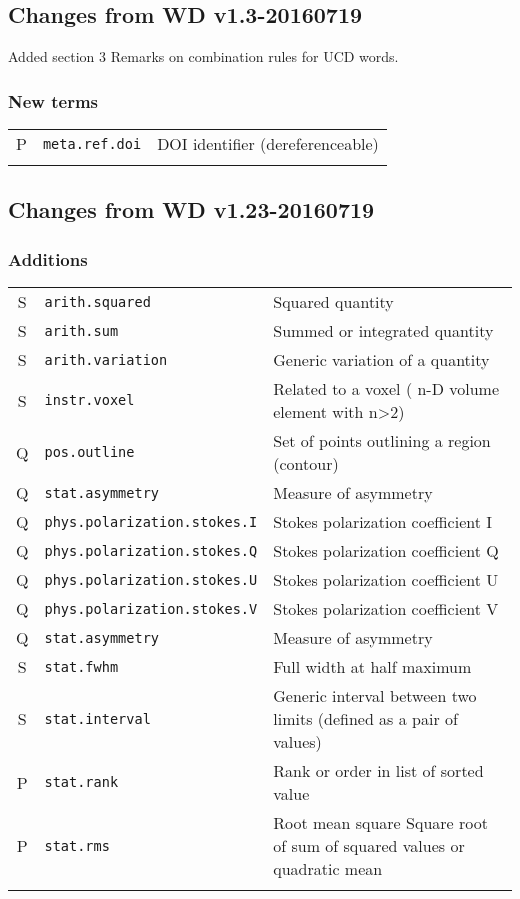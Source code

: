 \documentclass[11pt,a4paper]{ivoa}
\begin{document}
\subsection{Changes from WD v1.3-20160719}
Added section 3 Remarks on combination rules for UCD words.

\subsubsection*{New terms}
\footnotesize\begin{longtable}[h!]{c|p{39.5ex}|D{0.45\textwidth}}
\sptablerule
P & {\tt meta.ref.doi} & DOI identifier (dereferenceable)\\
\sptablerule
\end{longtable}

\subsection{Changes from WD v1.23-20160719}
\subsubsection*{Additions}
\footnotesize\begin{longtable}[h!]{c|p{39.5ex}|D{0.45\textwidth}}
\sptablerule
S & {\tt arith.squared} & Squared quantity\\
S & {\tt arith.sum} & Summed or integrated quantity\\
S & {\tt arith.variation} & Generic variation of a quantity\\
S & {\tt instr.voxel} & Related to a voxel ( n-D volume element with n>2)\\
Q & {\tt pos.outline} & Set of points outlining a region (contour)\\
Q & {\tt stat.asymmetry} & Measure of asymmetry\\
Q & {\tt phys.polarization.stokes.I} & Stokes polarization coefficient I\\
Q & {\tt phys.polarization.stokes.Q} & Stokes polarization coefficient Q\\
Q & {\tt phys.polarization.stokes.U} & Stokes polarization coefficient U\\
Q & {\tt phys.polarization.stokes.V} & Stokes polarization coefficient V\\
Q & {\tt stat.asymmetry} & Measure of asymmetry\\
S & {\tt stat.fwhm} & Full width at half maximum\\
S & {\tt stat.interval} & Generic interval between two limits (defined as a pair of values)\\
P & {\tt stat.rank} & Rank or order in list of sorted value\\
P & {\tt stat.rms} & Root mean square  Square root of sum of squared values or quadratic mean\\
\sptablerule
\end{longtable}
\end{document}
